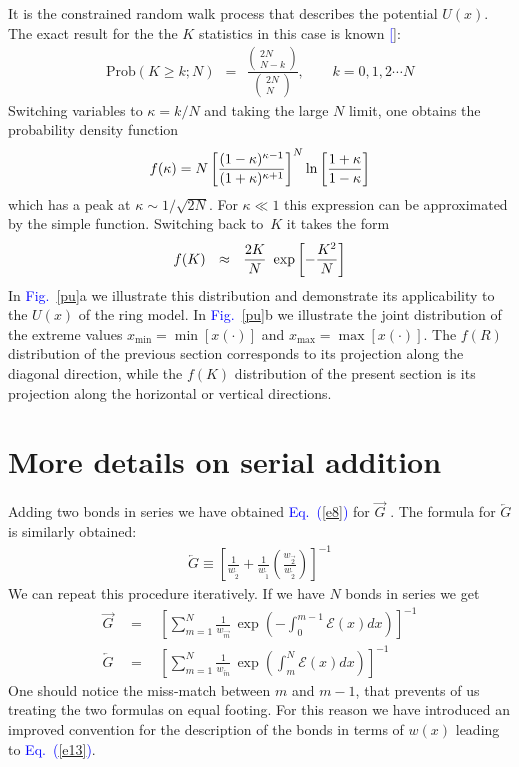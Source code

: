 \documentclass[aps,prl,floats,floatfix,twocolumn]{revtex4}
\newcommand{\mylabel}[1]{\label{#1}}
\newcommand{\beq}{\begin{eqnarray}}
\newcommand{\eeq}{\end{eqnarray}}
\newcommand{\be}[1]{\begin{eqnarray}\ifthenelse{#1=-1}
{\nonumber}{\ifthenelse{#1=0}{}{\mylabel{e#1}}}}
\newcommand{\ee}{\end{eqnarray}}
\newcommand{\Eq}[1]{\textcolor{blue}{Eq.\!\!~(\ref{#1})}}
\newcommand{\Fig}[1]{\textcolor{blue}{Fig.}\!\!~\ref{#1}}
\renewcommand{\cite}[1]{\textcolor{blue}{[\onlinecite{#1}}]} %
\begin{document}
It is the constrained random walk process that describes the potential $U(x)$. 
The exact result for the the $K$ statistics in this case is known \cite{dwass}:
%
\beq
\text{Prob}(K \geq k;N) \ \ = \ \  
\frac
{\left(\begin{array}{c}2N \\N-k\end{array}\right)}
{\left(\begin{array}{c}2N \\N\end{array}\right)},  
\ \ \ \ \ \ \ \ \ k = 0,1,2 \cdots N
\eeq
%
Switching variables to $\kappa=k/N$ and taking the large $N$ limit, 
one obtains the probability density function 
%
\be{50}
f(\kappa) = 
N \left[\frac{(1-\kappa)^{\kappa-1}}{(1+\kappa)^{\kappa+1}}\right]^N 
\ln \left[\frac{1+\kappa}{1-\kappa} \right] 
\ee
%
which has a peak at $\kappa \sim 1/\sqrt{2N}$.
For $\kappa\ll1$ this expression can be approximated 
by the simple function. Switching back to~$K$ 
it takes the form 
%
\be{51}
f(K) \ \ \approx \ \ \frac{2K}{N} \ \exp\left[-\frac{K^2}{N}\right]
\ee
%
In \Fig{pu}a we illustrate this distribution and 
demonstrate its applicability to the ${U(x)}$ of the ring model.
In \Fig{pu}b we illustrate the joint distribution of the 
extreme values ${x_{\text{min}}=\min[x(\cdot)]}$ and ${x_{\text{max}}=\max[x(\cdot)]}$.
The $f(R)$ distribution of the previous section corresponds to its projection 
along the diagonal direction, while the $f(K)$ distribution of the present section 
is its projection along the horizontal or vertical directions. 


\section{More details on serial addition}

Adding two bonds in series we have obtained \Eq{e8} for $\overrightarrow{G}$ .
The formula for $\overleftarrow{G}$ is similarly obtained:  
%
\beq
\overleftarrow{G} \equiv 
\left[ \frac{1}{w_{\overleftarrow{2}}} + 
\frac{1}{w_{\overleftarrow{1}}} 
\left(\frac{w_{\overrightarrow{2}}}{w_{\overleftarrow{2}}}\right) \right]^{-1}
\eeq
%
We can repeat this procedure iteratively.  
If we have $N$ bonds in series we get
%
\beq
\overrightarrow{G} \  \ &=& \ \ \left[ \sum_{m=1}^N \frac{1}{w_{\overrightarrow{m}}} 
\,\exp\left(-\int_0^{m{-}1}\!\!\!\!\!\!\!\mathcal{E}(x)dx \right) \right]^{-1} 
\\
\overleftarrow{G} \  \ &=& \ \ \left[ \sum_{m=1}^N \frac{1}{w_{\overleftarrow{m}}} 
\,\exp\left(\int_m^{N}\!\!\mathcal{E}(x)dx \right) \right]^{-1} 
\eeq
%
One should notice the miss-match between $m$ and $m{-}1$, that prevents 
of us treating the two formulas on equal footing. For this reason 
we have introduced an improved convention for the description of the 
bonds in terms of $w(x)$ leading to \Eq{e13}.   
\end{document}
